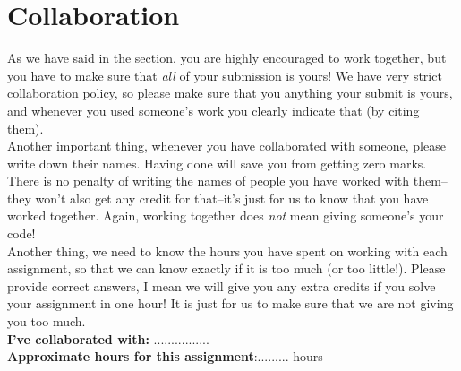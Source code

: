 \documentclass[paper=a4, fontsize=11pt]{scrartcl} %
\numberwithin{equation}{section} %
\numberwithin{figure}{section} %
\numberwithin{table}{section} %
\begin{document}
\section{Collaboration}
As we have said in the section, you are highly encouraged to work together, but you have to make sure that \textit{all} of your submission is yours! We have very strict collaboration policy, so please make sure that you anything your submit is yours, and whenever you used someone's work you clearly indicate that (by citing them).\\
Another important thing, whenever you have collaborated with someone, please write down their names. Having done will save you from getting zero marks. There is no penalty of writing the names of people you have worked with them--they won't also get any credit for that--it's just for us to know that you have worked together. Again, working together does \textit{not} mean giving someone's your code!\\
Another thing, we need to know the hours you have spent on working with each assignment, so that we can know exactly if it is too much (or too little!). Please provide correct answers, I mean we will give you any extra credits if you solve your assignment in one hour! It is just for us to make sure that we are not giving you too much.
\\

\textbf{I've collaborated with:} ................\\
\textbf{Approximate hours for this assignment}:......... hours


 
\end{document}
